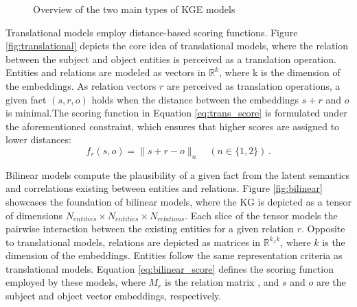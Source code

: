 \begin{figure}[t!]
    \centering
    \qquad
    \caption{Overview of the two main types of KGE models}
    \label{fig:kge_overview}
\end{figure}

Translational models employ distance-based scoring functions. Figure \ref{fig:translational} depicts the core idea of translational models, where the relation between the subject and object entities is perceived as a translation operation. Entities and relations are modeled as vectors in ${\mathbb{R}}^{k}$, where k is the dimension of the embeddings. As relation vectors $r$ are perceived as translation operations, a given fact $(s,r,o)$ holds when the distance between the embeddings $s+r$ and $o$ is minimal.The scoring function in Equation \ref{eq:trans_score} is formulated under the aforementioned constraint, which ensures that higher scores are assigned to lower distances:
\begin{equation}\label{eq:trans_score}
    f_r(s,o)=\|s + r - o\|_n
    \quad
    ( n \in \{1,2\})\,.
\end{equation} 

Bilinear models compute the plausibility of a given fact from the latent semantics and correlations existing between entities and relations. Figure \ref{fig:bilinear} showcases the foundation of bilinear models, where the KG is depicted as a tensor of dimensions $N_{entities} \times N_{entities} \times N_{relations}$. Each slice of the tensor models the pairwise interaction between the existing entities for a given relation $r$. Opposite to translational models, relations are depicted as matrices in $\mathbb{R}^{k_x k}$, where $k$ is the dimension of the embeddings. Entities follow the same representation criteria as translational models. Equation \ref{eq:bilinear_score} defines the scoring function employed by these models, where $M_r$ is the relation matrix , and $s$ and $o$ are the subject and object vector embeddings, respectively.

